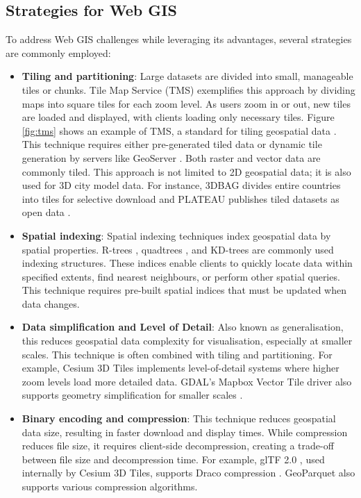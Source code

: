 \subsection{Strategies for Web GIS}
\label{tb:strategies_for_webgis}

To address Web GIS challenges while leveraging its advantages, several strategies are commonly employed:
\begin{itemize}
  \item \textbf{Tiling and partitioning}: Large datasets are divided into small, manageable tiles or chunks. Tile Map Service (TMS) exemplifies this approach by dividing maps into square tiles for each zoom level. As users zoom in or out, new tiles are loaded and displayed, with clients loading only necessary tiles. Figure \ref{fig:tms} shows an example of TMS, a standard for tiling geospatial data \citep{tms}. This technique requires either pre-generated tiled data or dynamic tile generation by servers like GeoServer \citep{geoserver}. Both raster and vector data are commonly tiled. This approach is not limited to 2D geospatial data; it is also used for 3D city model data. For instance, 3DBAG divides entire countries into tiles for selective download \citep{3dbag} and PLATEAU publishes tiled datasets as open data \citep{plateau}.

  \item \textbf{Spatial indexing}: Spatial indexing techniques index geospatial data by spatial properties. R-trees \citep{guttman_1984}, quadtrees \citep{finkel_1974}, and KD-trees \citep{bentley_1975} are commonly used indexing structures. These indices enable clients to quickly locate data within specified extents, find nearest neighbours, or perform other spatial queries. This technique requires pre-built spatial indices that must be updated when data changes.

  \item \textbf{Data simplification and Level of Detail}: Also known as generalisation, this reduces geospatial data complexity for visualisation, especially at smaller scales. This technique is often combined with tiling and partitioning. For example, Cesium 3D Tiles \citep{3d_tiles} implements level-of-detail systems where higher zoom levels load more detailed data. GDAL's Mapbox Vector Tile driver also supports geometry simplification for smaller scales \citep{gdal_mvt}.

  \item \textbf{Binary encoding and compression}: This technique reduces geospatial data size, resulting in faster download and display times. While compression reduces file size, it requires client-side decompression, creating a trade-off between file size and decompression time. For example, glTF 2.0 \citep{gltf_2_0}, used internally by Cesium 3D Tiles, supports Draco compression \citep{draco}. GeoParquet \citep{geoparquet} also supports various compression algorithms.
\end{itemize}

